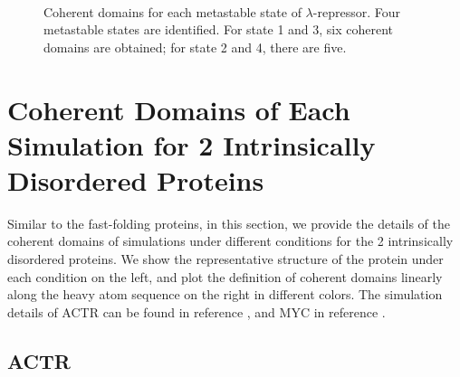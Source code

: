 \documentclass[12pt]{article}
\begin{document}

\begin{figure}[htbp]
  \addtocounter{subfigure}{3}
  \\
  \caption{\label{lambda}Coherent domains for each metastable state of $\lambda$-repressor. Four metastable states are identified. For state 1 and 3, six coherent domains are obtained; for state 2 and 4, there are five.}
\end{figure}

\clearpage

\section*{Coherent Domains of Each Simulation for 2 Intrinsically Disordered Proteins}

Similar to the fast-folding proteins, in this section, we provide the details of the coherent domains of simulations under different conditions for the 2 intrinsically disordered proteins. We show the representative structure of the protein under each condition on the left, and plot the definition of coherent domains linearly along the heavy atom sequence on the right in different colors. The simulation details of ACTR can be found in reference \cite{ACTR}, and MYC in reference \cite{MYC}.

\subsection*{ACTR}
\end{document}
